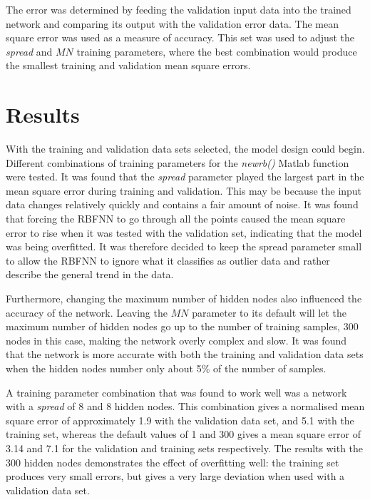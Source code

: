 The error was determined by feeding the validation input data into the trained network and comparing its output with the validation error data. The mean square error was used as a measure of accuracy. This set was used to adjust the \emph{spread} and $\mathit{MN}$ training parameters, where the best combination would produce the smallest training and validation mean square errors. 

\section{Results}

With the training and validation data sets selected, the model design could begin. Different combinations of training parameters for the \emph{newrb()} Matlab function were tested. It was found that the \emph{spread} parameter played the largest part in the mean square error during training and validation. This may be because the input data changes relatively quickly and contains a fair amount of noise. It was found that forcing the RBFNN to go through all the points caused the mean square error to rise when it was tested with the validation set, indicating that the model was being overfitted. It was therefore decided to keep the spread parameter small to allow the RBFNN to ignore what it classifies as outlier data and rather describe the general trend in the data. 

Furthermore, changing the maximum number of hidden nodes also influenced the accuracy of the network. Leaving the $MN$ parameter to its default will let the maximum number of hidden nodes go up to the number of training samples, 300 nodes in this case, making the network overly complex and slow. It was found that the network is more accurate with both the training and validation data sets when the hidden nodes number only about 5\% of the number of samples. 

A training parameter combination that was found to work well was a network with a \emph{spread} of 8 and 8 hidden nodes. This combination gives a normalised mean square error of approximately 1.9 with the validation data set, and 5.1 with the training set, whereas the default values of 1 and 300 gives a mean square error of 3.14 and 7.1 for the validation and training sets respectively. The results with the 300 hidden nodes demonstrates the effect of overfitting well: the training set produces very small errors, but gives a very large deviation when used with a validation data set.    

